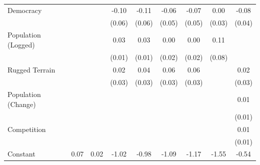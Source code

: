 \documentclass[12pt, letterpaper]{article}
\begin{document}
\begin{landscape}
\begin{table}[htbp]
\begin{footnotesize}
\begin{tabular}{l*{8}{c}}
Democracy           &                     &                     &       -0.10\sym{+}  &       -0.11\sym{*}  &       -0.06         &       -0.07         &        0.00         &       -0.08\sym{*}  \\
                    &                     &                     &      (0.06)         &      (0.06)         &      (0.05)         &      (0.05)         &      (0.03)         &      (0.04)         \\
Population (Logged) &                     &                     &        0.03\sym{*}  &        0.03\sym{**} &        0.00         &        0.00         &        0.11         &                     \\
                    &                     &                     &      (0.01)         &      (0.01)         &      (0.02)         &      (0.02)         &      (0.08)         &                     \\
Rugged Terrain      &                     &                     &        0.02         &        0.04         &        0.06\sym{**} &        0.06\sym{**} &                     &        0.02         \\
                    &                     &                     &      (0.03)         &      (0.03)         &      (0.03)         &      (0.03)         &                     &      (0.03)         \\
Population (Change) &                     &                     &                     &                     &                     &                     &                     &        0.01         \\
                    &                     &                     &                     &                     &                     &                     &                     &      (0.01)         \\
Competition         &                     &                     &                     &                     &                     &                     &                     &        0.01         \\
                    &                     &                     &                     &                     &                     &                     &                     &      (0.01)         \\
Constant            &        0.07\sym{*}  &        0.02         &       -1.02\sym{***}&       -0.98\sym{**} &       -1.09\sym{***}&       -1.17\sym{***}&       -1.55         &       -0.54\sym{*}  \\

\end{tabular}
\end{footnotesize}
\end{table}
\end{landscape}
\end{document}
